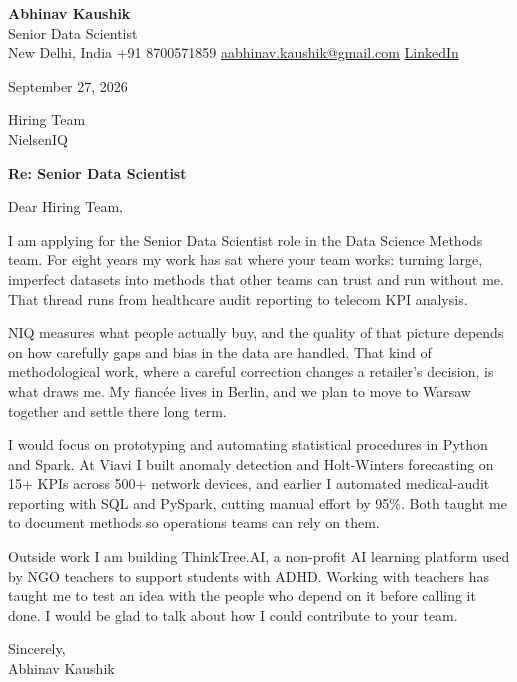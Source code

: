 \documentclass[11pt,a4paper]{article}
\begin{document}
{\Large\bfseries Abhinav Kaushik}\\
Senior Data Scientist\\
New Delhi, India \textbar{} +91 8700571859 \textbar{} \href{mailto:aabhinav.kaushik@gmail.com}{aabhinav.kaushik@gmail.com} \textbar{} \href{https://www.linkedin.com/in/abhinav-kaushik10/}{LinkedIn}  

September 27, 2026

Hiring Team\\
NielsenIQ

\textbf{Re: Senior Data Scientist}

Dear Hiring Team,

I am applying for the Senior Data Scientist role in the Data Science Methods team. For eight years my work has sat where your team works: turning large, imperfect datasets into methods that other teams can trust and run without me. That thread runs from healthcare audit reporting to telecom KPI analysis.

NIQ measures what people actually buy, and the quality of that picture depends on how carefully gaps and bias in the data are handled. That kind of methodological work, where a careful correction changes a retailer's decision, is what draws me. My fiancée lives in Berlin, and we plan to move to Warsaw together and settle there long term.

I would focus on prototyping and automating statistical procedures in Python and Spark. At Viavi I built anomaly detection and Holt-Winters forecasting on 15+ KPIs across 500+ network devices, and earlier I automated medical-audit reporting with SQL and PySpark, cutting manual effort by 95\%. Both taught me to document methods so operations teams can rely on them.

Outside work I am building ThinkTree.AI, a non-profit AI learning platform used by NGO teachers to support students with ADHD. Working with teachers has taught me to test an idea with the people who depend on it before calling it done. I would be glad to talk about how I could contribute to your team.

Sincerely,\\[4pt]
Abhinav Kaushik
\end{document}
